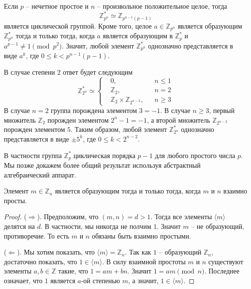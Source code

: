 \begin{claim}
Если $p$ -- нечетное простое и $n$ -- произвольное положительное целое, тогда
\[
\mathbb Z_{p^n}^* \simeq \mathbb Z_{p^{n-1}(p-1)}
\]
является циклической группой. Кроме того, целое $a\in \mathbb Z_{p^n}$ является образующим $\mathbb Z_{p^n}^* $ тогда и только тогда, когда $a$ является образующим в $\mathbb Z_p^*$ и $a^{p-1}\neq 1 \pmod{ p^2}$. Значит, любой элемент $\mathbb Z_{p^n}^*$ однозначно представляется в виде $a^k$, где $0\leqslant k < p^{n-1}(p-1)$.

В случае степени $2$ ответ будет следующим
\[
\mathbb Z_{2^n}^*\simeq
\left\{
\begin{aligned}
&0, & &n\leqslant 1\\
&\mathbb Z_2, & &n = 2\\
&\mathbb Z_2\times \mathbb Z_{2^{n-2}}, & &n\geqslant 3
\end{aligned}
\right.
\]
В случае $n = 2$ группа порождена элементом $3 = -1$. В случае $n \geqslant 3$, первый множитель $\mathbb Z_2$ порожден элементом $2^n - 1 = -1$, а второй множитель $\mathbb Z_{2^{n-2}}$ порожден элементом $5$. Таким образом, любой элемент $\mathbb Z_{2^n}^*$ однозначно представляется в виде $\pm 5^k$, где $0\leqslant k < 2^{n-2}$.
\end{claim}

В частности группа $\mathbb Z_p^*$ циклическая порядка $p-1$ для любого простого числа $p$. Мы позже докажем более общий результат используя абстрактный алгебраический аппарат.

\begin{claim}
Элемент $m\in \mathbb Z_n$ является образующим тогда и только тогда, когда $m$ и $n$ взаимно просты.
\end{claim}
\begin{proof}
($\Rightarrow$). Предположим, что $(m, n) = d > 1$. Тогда все элементы $\langle m\rangle$ делятся на $d$. В частности, мы никогда не полчим $1$. Значит $m$ -- не образующий, противоречие. То есть $m$ и $n$ обязаны быть взаимно простыми.

($\Leftarrow$). Мы хотим показать, что $\langle m\rangle = \mathbb Z_n$. Так как $1$ -- образующий $\mathbb Z_n$, достаточно показать, что $1\in \langle m\rangle$. В силу взаимной простоты $m$ и $n$ существуют элементы  $a, b\in \mathbb Z$ такие, что $1 = a m + b n$. Значит $1 = a m \pmod n$. Последнее означает, что $1$ является $a$-ой степенью $m$, а значит, $1 \in \langle m \rangle$.
\end{proof}


